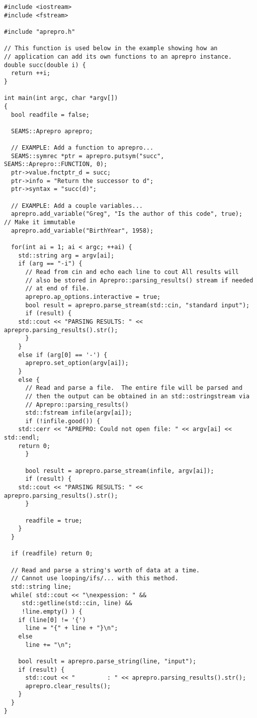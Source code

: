 \begin{lstlisting}
#include <iostream>
#include <fstream>

#include "aprepro.h"

// This function is used below in the example showing how an
// application can add its own functions to an aprepro instance.
double succ(double i) {
  return ++i;
}

int main(int argc, char *argv[])
{
  bool readfile = false;

  SEAMS::Aprepro aprepro;
  
  // EXAMPLE: Add a function to aprepro...
  SEAMS::symrec *ptr = aprepro.putsym("succ", SEAMS::Aprepro::FUNCTION, 0);
  ptr->value.fnctptr_d = succ;
  ptr->info = "Return the successor to d";
  ptr->syntax = "succ(d)";
  
  // EXAMPLE: Add a couple variables...
  aprepro.add_variable("Greg", "Is the author of this code", true);  // Make it immutable
  aprepro.add_variable("BirthYear", 1958);
  
  for(int ai = 1; ai < argc; ++ai) {
    std::string arg = argv[ai];
    if (arg == "-i") {
      // Read from cin and echo each line to cout All results will
      // also be stored in Aprepro::parsing_results() stream if needed
      // at end of file.
      aprepro.ap_options.interactive = true;
      bool result = aprepro.parse_stream(std::cin, "standard input");
      if (result) {
	std::cout << "PARSING RESULTS: " << aprepro.parsing_results().str();
      }
    }
    else if (arg[0] == '-') {
      aprepro.set_option(argv[ai]);
    } 
    else {
      // Read and parse a file.  The entire file will be parsed and
      // then the output can be obtained in an std::ostringstream via
      // Aprepro::parsing_results()
      std::fstream infile(argv[ai]);
      if (!infile.good()) {
	std::cerr << "APREPRO: Could not open file: " << argv[ai] << std::endl;
	return 0;
      }

      bool result = aprepro.parse_stream(infile, argv[ai]);
      if (result) {
	std::cout << "PARSING RESULTS: " << aprepro.parsing_results().str();
      }

      readfile = true;
    }
  }

  if (readfile) return 0;
    
  // Read and parse a string's worth of data at a time.
  // Cannot use looping/ifs/... with this method.
  std::string line;
  while( std::cout << "\nexpession: " &&
	 std::getline(std::cin, line) &&
	 !line.empty() ) {
    if (line[0] != '{') 
      line = "{" + line + "}\n";
    else
      line += "\n";
    
    bool result = aprepro.parse_string(line, "input");
    if (result) {
      std::cout << "         : " << aprepro.parsing_results().str();
      aprepro.clear_results();
    }
  }
}
\end{lstlisting}
